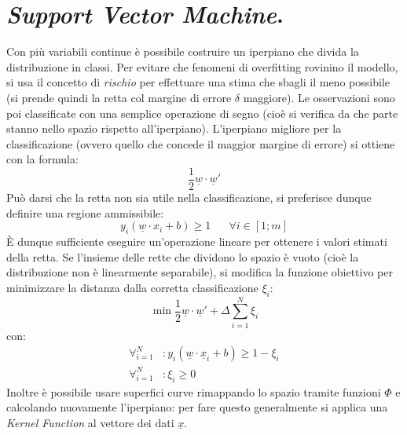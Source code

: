 \documentclass[11pt, a4page, twocolumn]{article}
\begin{document}
\section{\textit{Support Vector Machine}.}
Con più variabili continue è possibile costruire un iperpiano che divida la distribuzione in classi.
Per evitare che fenomeni di overfitting rovinino il modello, si usa il concetto di \textit{rischio} per effettuare una stima che sbagli il meno possibile (si prende quindi la retta col margine di errore $\delta$ maggiore).
Le osservazioni sono poi classificate con una semplice operazione di segno (cioè si verifica da che parte stanno nello spazio rispetto all'iperpiano).
L'iperpiano migliore per la classificazione (ovvero quello che concede il maggior margine di errore) si ottiene con la formula:
\begin{equation*}
 \frac{1}{2} \underline{w} \cdot \underline{w}'
\end{equation*}
Può darsi che la retta non sia utile nella classificazione, si preferisce dunque definire una regione ammissibile:
\begin{equation*}
  y_i (\underline{w} \cdot x_i + b) \ge 1 \hspace{20pt} \forall i \in [1; m]
\end{equation*}
È dunque sufficiente eseguire un'operazione lineare per ottenere i valori stimati della retta.
Se l'insieme delle rette che dividono lo spazio è vuoto (cioè la distribuzione non è linearmente separabile), si modifica la funzione obiettivo per minimizzare la distanza dalla corretta classificazione $\xi_i$:
\begin{equation*}
  \min{\frac{1}{2} \underline{w} \cdot \underline{w}' + \Delta \sum^N_{i=1}{\xi_i}}
\end{equation*}
con:
\begin{align*}
  \forall^N_{i=1} &: y_i(\underline{w} \cdot \underline{x}_i + b) \ge 1 - \xi_i \\
  \forall^N_{i=1} &: \xi_i \ge 0
\end{align*}
Inoltre è possibile usare superfici curve rimappando lo spazio tramite funzioni $\Phi$ e calcolando nuovamente l'iperpiano: per fare questo generalmente si applica una \textit{Kernel Function} al vettore dei dati $\underline{x}$.
\end{document}
